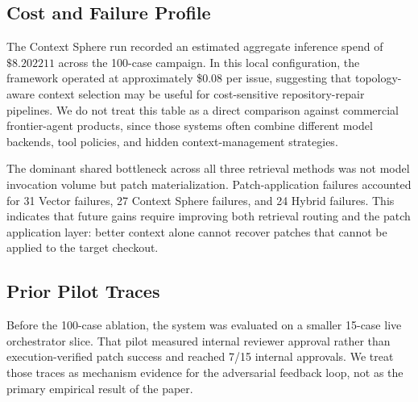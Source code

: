 \subsection{Cost and Failure Profile}

The Context Sphere run recorded an estimated aggregate inference spend of \(\$8.202211\) across the 100-case campaign. In this local configuration, the framework operated at approximately \$0.08 per issue, suggesting that topology-aware context selection may be useful for cost-sensitive repository-repair pipelines. We do not treat this table as a direct comparison against commercial frontier-agent products, since those systems often combine different model backends, tool policies, and hidden context-management strategies.

The dominant shared bottleneck across all three retrieval methods was not model invocation volume but patch materialization. Patch-application failures accounted for 31 Vector failures, 27 Context Sphere failures, and 24 Hybrid failures. This indicates that future gains require improving both retrieval routing and the patch application layer: better context alone cannot recover patches that cannot be applied to the target checkout.

\subsection{Prior Pilot Traces}

Before the 100-case ablation, the system was evaluated on a smaller 15-case live orchestrator slice. That pilot measured internal reviewer approval rather than execution-verified patch success and reached 7/15 internal approvals. We treat those traces as mechanism evidence for the adversarial feedback loop, not as the primary empirical result of the paper.
